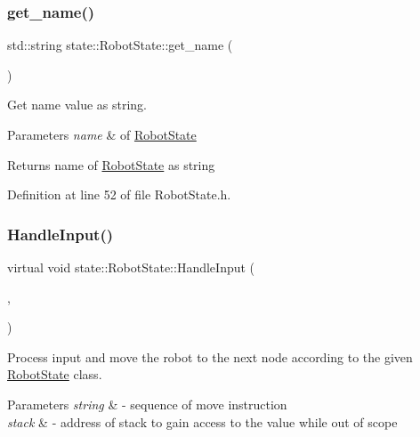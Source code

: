 \subsubsection{\texorpdfstring{get\_name()}{get\_name()}}
{\footnotesize\ttfamily std\+::string state\+::\+Robot\+State\+::get\+\_\+name (\begin{DoxyParamCaption}{ }\end{DoxyParamCaption})\hspace{0.3cm}{\ttfamily [inline]}}



Get name value as string. 


\begin{DoxyParams}{Parameters}
{\em name} & of \mbox{\hyperlink{classstate_1_1_robot_state}{Robot\+State}} \\
\hline
\end{DoxyParams}
\begin{DoxyReturn}{Returns}
name of \mbox{\hyperlink{classstate_1_1_robot_state}{Robot\+State}} as string 
\end{DoxyReturn}


Definition at line 52 of file Robot\+State.\+h.

\mbox{\label{classstate_1_1_robot_state_a82c70d0b51eb4ddca9de1ca49ae29e3e}} 
\subsubsection{\texorpdfstring{HandleInput()}{HandleInput()}}
{\footnotesize\ttfamily virtual void state\+::\+Robot\+State\+::\+Handle\+Input (\begin{DoxyParamCaption}\item[{std\+::stack$<$ \mbox{\hyperlink{classstate_1_1_robot_state}{Robot\+State}} $\ast$ $>$ \&}]{,  }\item[{const std\+::string \&}]{ }\end{DoxyParamCaption})\hspace{0.3cm}{\ttfamily [pure virtual]}}



Process input and move the robot to the next node according to the given \mbox{\hyperlink{classstate_1_1_robot_state}{Robot\+State}} class. 


\begin{DoxyParams}{Parameters}
{\em string} & -\/ sequence of move instruction \\
\hline
{\em stack} & -\/ address of stack to gain access to the value while out of scope \\
\hline
\end{DoxyParams}


